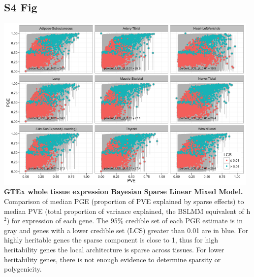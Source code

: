 \documentclass[10pt,letterpaper]{article}
\begin{document}
\begin{singlespace}
\subsection*{S4 Fig}
\includegraphics[width=13cm]{Figures/GenArch_Supp/S4Fig.png}
\label{S4_Fig}
{\bf GTEx whole tissue expression Bayesian Sparse Linear Mixed Model.} Comparison of median PGE (proportion of PVE explained by sparse effects) to median PVE (total proportion of variance explained, the BSLMM equivalent of h$^2$) for expression of each gene. The 95\% credible set of each PGE estimate is in gray and genes with a lower credible set (LCS) greater than 0.01 are in blue. For highly heritable genes the sparse component is close to 1, thus for high heritability genes the local architecture is sparse across tissues. For lower heritability genes, there is not enough evidence to determine sparsity or polygenicity. 


\end{singlespace}
\end{document}
